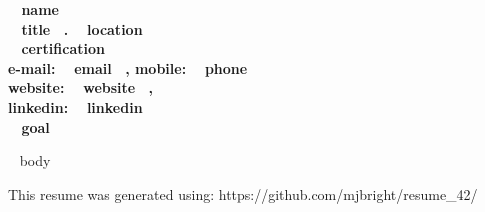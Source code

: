 \documentclass[11pt,english]{article}
\begin{document}

\begin{center}
\huge\bf\color{maincolor} ~{{ name }}~  \\
\small\color{black} ~{{ title }}~.
\small\color{black} ~{{ location }}~ \\
\small\color{black} ~{{ certification }}~ \\
\vspace{1.2mm}
\small\color{black} e-mail: ~{{ email }}~,
\small\color{black} mobile: ~{{ phone }}~ \\
\small\color{black} website: ~{{ website }}~, \\
\small\color{black} linkedin: ~{{ linkedin }}~ \\
\vspace{1.2mm}
\small\color{black} ~{{ goal }}~

\end{center}
\vspace{0.5mm}

~{{ body }}~

\begin{flushright}
\vspace{0.5mm}
\small This resume was generated using: https://github.com/mjbright/resume\_42/
\end{flushright}
\end{document}
